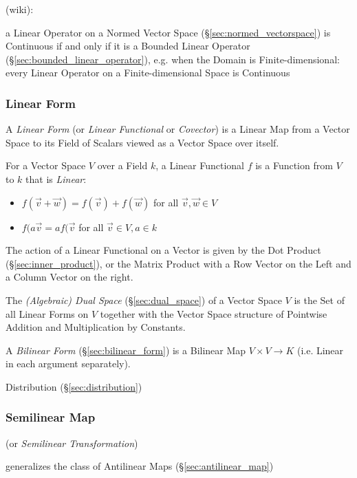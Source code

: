 (wiki):

a Linear Operator on a Normed Vector Space
(\S\ref{sec:normed_vectorspace}) is Continuous if and only if it is a
Bounded Linear Operator (\S\ref{sec:bounded_linear_operator}), e.g.
when the Domain is Finite-dimensional: every Linear Operator on a
Finite-dimensional Space is Continuous



\subsubsection{Linear Form}\label{sec:linear_form}

A \emph{Linear Form} (or \emph{Linear Functional} or \emph{Covector}) is a
Linear Map from a Vector Space to its Field of Scalars viewed as a Vector Space
over itself.

For a Vector Space $V$ over a Field $k$, a Linear Functional $f$ is a Function
from $V$ to $k$ that is \emph{Linear}:
\begin{itemize}
\item $f(\vec{v} + \vec{w}) = f(\vec{v}) + f(\vec{w})$ for all $\vec{v},
  \vec{w} \in V$
\item $f(a\vec{v} = af(\vec{v}$ for all $\vec{v} \in V, a \in k$
\end{itemize}

The action of a Linear Functional on a Vector is given by the Dot Product
(\S\ref{sec:inner_product}), or the Matrix Product with a Row Vector on the
Left and a Column Vector on the right.

The \emph{(Algebraic) Dual Space} (\S\ref{sec:dual_space}) of a Vector Space
$V$ is the Set of all Linear Forms on $V$ together with the Vector Space
structure of Pointwise Addition and Multiplication by Constants.

A \emph{Bilinear Form} (\S\ref{sec:bilinear_form}) is a Bilinear Map $V \times
V \rightarrow K$ (i.e. Linear in each argument separately).

Distribution (\S\ref{sec:distribution})



\subsubsection{Semilinear Map}\label{sec:semilinear_map}

(or \emph{Semilinear Transformation})

generalizes the class of Antilinear Maps (\S\ref{sec:antilinear_map})



